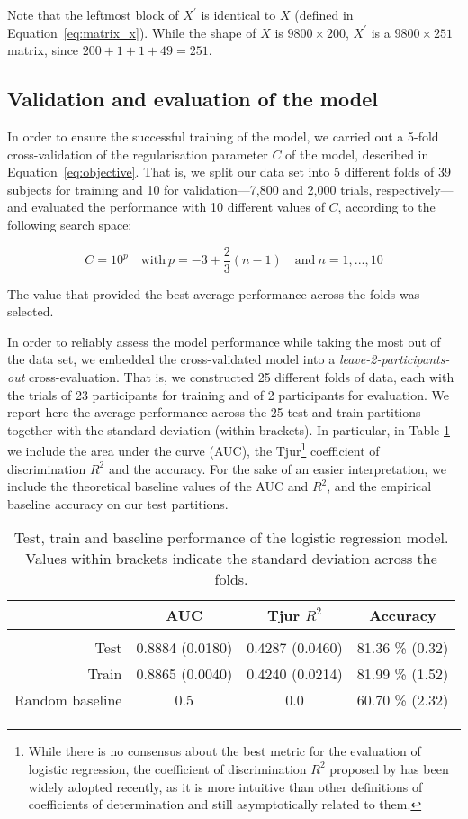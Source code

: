 {Note that the leftmost block of $X^{\prime}$ is identical to $X$ (defined in Equation~\ref{eq:matrix_x}). While the shape of $X$ is $9800 \times 200$, $X^{\prime}$ is a $9800 \times 251$ matrix, since $200 + 1 + 1 + 49 = 251$.

\subsection{Validation and evaluation of the model} 
\label{sec:globsal-model_eval}
In order to ensure the successful training of the model, we carried out a 5-fold cross-validation of the regularisation parameter $C$ of the model, described in Equation~\ref{eq:objective}. That is, we split our data set into 5 different folds of 39 subjects for training and 10 for validation---7,800 and 2,000 trials, respectively---and evaluated the performance with 10 different values of $C$, according to the following search space:

\[C = 10^{p} \quad\text{with}~p = -3 + \frac{2}{3}(n-1) \quad\text{and}~n=1, ..., 10 \]

The value that provided the best average performance across the folds was selected.

In order to reliably assess the model performance while taking the most out of the data set, we embedded the cross-validated model into a \textit{leave-2-participants-out} cross-evaluation. That is, we constructed 25 different folds of data, each with the trials of 23 participants for training and of 2 participants for evaluation. We report here the average performance across the 25 test and train partitions together with the standard deviation (within brackets). In particular, in Table \ref{tab:performance} we include the area under the curve (AUC), the Tjur\footnote{While there is no consensus about the best metric for the evaluation of logistic regression, the coefficient of discrimination $R^{2}$ proposed by \citet{tjur2009r2} has been widely adopted recently, as it is more intuitive than other definitions of coefficients of determination and still asymptotically related to them.} coefficient of discrimination $R^{2}$ and the accuracy. For the sake of an easier interpretation, we include the theoretical baseline values of the AUC and $R^{2}$, and the empirical baseline accuracy on our test partitions.

\begin{table}[ht]
\centering
  \begin{tabular}{rccc}
    \multicolumn{1}{l}{} & AUC             & Tjur $R^{2}$         & Accuracy        \\
    \hline \\
    Test                 & 0.8884 (0.0180) & 0.4287 (0.0460) & 81.36 \% (0.32) \\
    Train                & 0.8865 (0.0040) & 0.4240 (0.0214) & 81.99 \% (1.52) \\
    Random baseline      & 0.5             & 0.0             & 60.70 \% (2.32)
  \end{tabular}
\caption{Test, train and baseline performance of the logistic regression model. Values within brackets indicate the standard deviation across the folds.}
\label{tab:performance}
\end{table}

}
